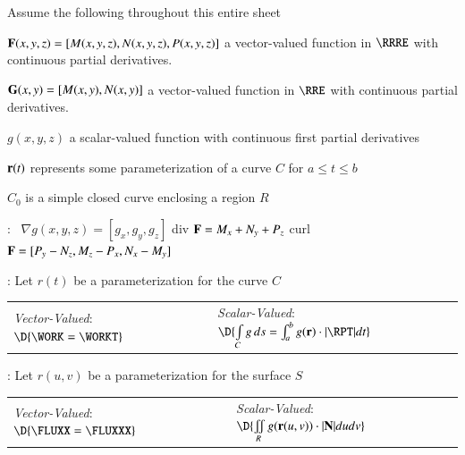 \documentclass[11pt]{article}
\renewenvironment{itemize}{
  \begin{list}{}{
    \setlength{\leftmargin}{1em}
  }
}{
  \end{list}
}
\begin{document}

Assume the following throughout this entire sheet 
\begin{itemize}
	\item[$\bullet$] ${\bf F}(x,y,z) = [M(x,y,z),N(x,y,z),P(x,y,z)] $ a vector-valued function in $\RRRE$ with continuous partial derivatives.
	\item[$\bullet$] ${\bf G}(x,y) = [M(x,y),N(x,y)] $ a vector-valued function in $\RRE$ with continuous partial derivatives.
	\item[$\bullet$] $g(x,y,z)$ a scalar-valued function with continuous first partial derivatives
	\item[$\bullet$] ${\bf r}(t)$ represents some parameterization of a curve $C$ for $a \le t \le b$
	\item[$\bullet$] $C_0$ is a simple closed curve enclosing a region $R$
\end{itemize}

\vspace{0.2cm}

:
$\left. \, \right.$ $\nabla g(x,y,z) = [g_x,g_y,g_z]$ \hspace{1.0cm} div ${\bf F} = M_x + N_y + P_z$ \hspace{1.0cm} curl ${\bf F} = [P_y-N_z,M_z-P_x,N_x-M_y]$

\vspace{0.2cm}

: Let $r(t)$ be a parameterization for the curve $C$\\
\setlength{\extrarowheight}{0.2cm}
\begin{tabular}{p{9.5cm}p{9.5cm}}
	{\it Vector-Valued}: \,\,$\D{\WORK = \WORKT}$ & 
	{\it Scalar-Valued}: \,\,$\D{\int \limits_{C} g \, ds = \int_{a}^{b} g({\bf r}) \cdot |\RPT| dt}$\\
\end{tabular}

\vspace{0.1cm}

: Let $r(u,v)$ be a parameterization for the surface $S$\\
\setlength{\extrarowheight}{0.2cm}
\begin{tabular}{p{9.5cm}p{9.5cm}}
	{\it Vector-Valued}: \,\,$\D{\FLUXX = \FLUXXX}$ &
	{\it Scalar-Valued}: \,\,$\D{\iint \limits_{R} g({\bf r}(u,v)) \cdot |{\bf N}| dudv}$ \\
\end{tabular}
\end{document}
